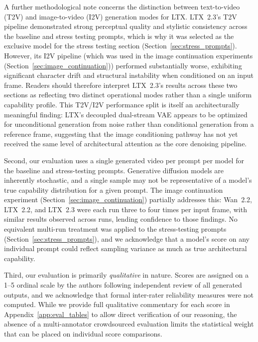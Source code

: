 \documentclass[sigconf]{acmart}
\begin{document}
A further methodological note concerns the distinction between
text-to-video (T2V) and image-to-video (I2V) generation modes
for LTX. LTX~2.3's T2V pipeline demonstrated strong perceptual
quality and stylistic consistency across the baseline and stress
testing prompts, which is why it was selected as the exclusive
model for the stress testing section (Section~\ref{sec:stress_prompts}).
However, its I2V pipeline (which was used in the image continuation
experiments (Section~\ref{sec:image_continuation})) performed
substantially worse, exhibiting significant character drift and
structural instability when conditioned on an input frame.
Readers should therefore interpret LTX~2.3's results across
these two sections as reflecting two distinct operational modes
rather than a single uniform capability profile. This T2V/I2V
performance split is itself an architecturally meaningful finding:
LTX's decoupled dual-stream VAE \cite{hacohen2026ltx} appears
to be optimized for unconditional generation from noise rather
than conditional generation from a reference frame, suggesting
that the image conditioning pathway has not yet received the
same level of architectural attention as the core denoising pipeline.

Second, our evaluation uses a single generated video per prompt per model
for the baseline and stress-testing prompts. Generative diffusion models
are inherently stochastic, and a single sample may not be representative
of a model's true capability distribution for a given prompt. The
image continuation experiment (Section~\ref{sec:image_continuation})
partially addresses this: Wan~2.2, LTX~2.2, and LTX~2.3 were each
run three to four times per input frame, with similar results observed
across runs, lending confidence to those findings. No equivalent
multi-run treatment was applied to the stress-testing prompts
(Section~\ref{sec:stress_prompts}), and we acknowledge that a model's score
on any individual prompt could reflect sampling variance as much as
true architectural capability.

Third, our evaluation is primarily \textit{qualitative} in nature.
Scores are assigned on a 1--5 ordinal scale by the authors following
independent review of all generated outputs, and we acknowledge that
formal inter-rater reliability measures \cite{krippendorff2011content}
were not computed. While we provide full qualitative commentary for
each score in Appendix~\ref{app:eval_tables} to allow direct
verification of our reasoning, the absence of a multi-annotator
crowdsourced evaluation limits the statistical weight that can be
placed on individual score comparisons.
\end{document}
